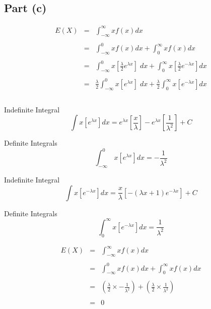 \documentclass[a4paper,12pt]{article}
\begin{document}
	
	\newpage 
	
	\subsection*{Part (c)}
	
	\begin{eqnarray*}
		E(X) &=& \int^{\infty}_{-\infty} x f(x) dx \\
		& & \\
		&=& \int^{0}_{-\infty} x f(x) dx + \int^{\infty}_{0} x f(x) dx  \\
		& & \\
		&=& \int^{0}_{-\infty} x \left[ \frac{\lambda}{2}e^{  \lambda  x}\right] \;dx + \int^{\infty}_{0} x \left[ \frac{\lambda}{2}e^{ - \lambda  x}\right] dx  \\
		& & \\
		&=&  \frac{\lambda}{2} \int^{0}_{ - \infty} x \left[e^{  \lambda  x}\right] \;dx +  \frac{\lambda}{2} \int^{\infty}_{0} x \left[ e^{ - \lambda  x}\right] dx  \\
		& & \\
	\end{eqnarray*}
	\begin{framed}
		Indefinite Integral
		\[\int x\left[e^{\lambda x}\right]dx= e^{\lambda x}\left[\frac{x}{\lambda }\right] - e^{\lambda x}\left[\frac{1}{\lambda ^2}\right] + C\]
		
		Definite Integrals
		\[\int _{-\infty \:}^0x\left[e^{\lambda x}\right]dx=-\frac{1}{\lambda ^2}\]
	\end{framed}
	
	\begin{framed}
		Indefinite Integral
		\[\int x\left[e^{-\lambda x}\right]dx= \frac{x}{\lambda }\left[ - (\lambda x + 1) e^{-\lambda x} \right]+ C\]
		
		Definite Integrals
		\[\int^{\infty}_{0}x\left[e^{-\lambda x}\right]dx=\frac{1}{\lambda ^2}\]
	\end{framed}
	
	\begin{eqnarray*}
		E(X) &=& \int^{\infty}_{-\infty} x f(x) dx \\
		& & \\
		&=& \int^{0}_{-\infty} x f(x) dx + \int^{\infty}_{0} x f(x) dx  \\
		& & \\
		&=& \left( \frac{\lambda}{2} \times -\frac{1}{\lambda ^2} \right) + \left( \frac{\lambda}{2} \times \frac{1}{\lambda ^2}\right)\\
		& & \\
		&=& 0 \\
	\end{eqnarray*}
	
\end{document}
